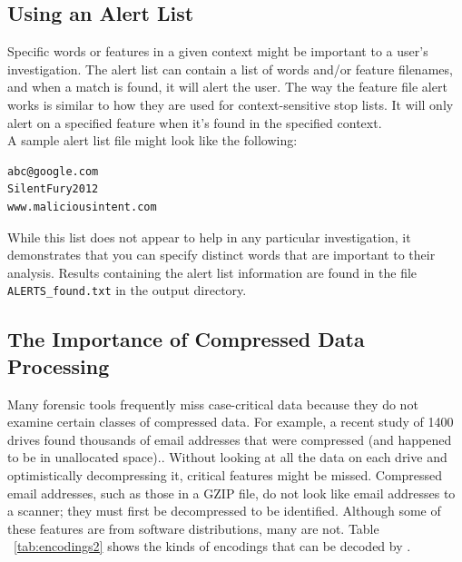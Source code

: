 \documentclass[11pt]{article} %
\begin{document}
\subsection{Using an Alert List}
Specific words or features in a given context might be important to a user's investigation. The alert list can contain a list of words and/or feature filenames, and when a match is found, it will alert the user. The way the feature file alert works is similar to how they are used for context-sensitive stop lists. It will only alert on a specified feature when it's found in the specified context.\\

A sample alert list file might look like the following:
\begin{verbatim}
abc@google.com
SilentFury2012
www.maliciousintent.com
\end{verbatim}

While this list does not appear to help in any particular investigation, it demonstrates that you can specify distinct words that are important to their analysis. Results containing the alert list information are found in the file \texttt{ALERTS\_found.txt} in the \bulk output directory.

\subsection{The Importance of Compressed Data Processing}
\label{compressedProcessing}

Many forensic tools frequently miss case-critical data because they do not examine certain classes of compressed data. For example, a recent study of 1400 drives found thousands of email addresses that were compressed (and happened to be in unallocated space).\cite{encodedEvidence}. Without looking at all the data on each drive and optimistically decompressing it, critical features might be missed. Compressed email addresses, such as those in a GZIP file, do not look like email addresses to a scanner; they must first be decompressed to be identified. Although some of these features are from software distributions, many are not. Table ~\ref{tab:encodings2} shows the kinds of encodings that can be decoded by \bulk \cite{encodedEvidence}.
\end{document}
